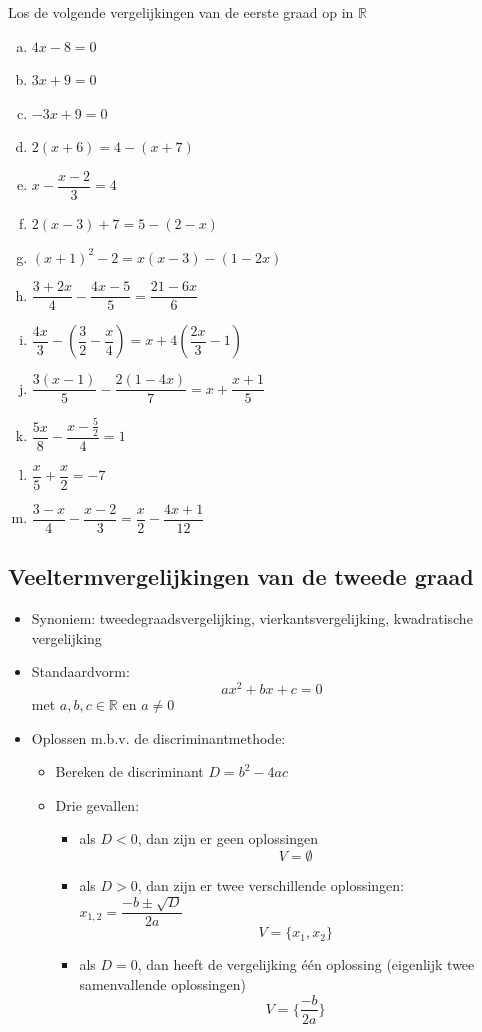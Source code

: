 \documentclass[12pt]{article}
\begin{document}
\begin{oefening}
Los de volgende vergelijkingen van de eerste graad op in $\mathbb{R}$
\begin{multicols}{2}
\begin{enumerate}[(a)]
  \itemsep0.7em
  \item $4x-8=0$
  \item $3x+9=0$
  \item $-3x+9=0$
  \item $2(x+6)=4-(x+7)$
  \item $x - \dfrac{x-2}{3} = 4$
  \item $2(x-3)+7=5-(2-x)$
  \item $(x+1)^2-2=x(x-3)-(1-2x)$
  \item $\dfrac{3+2x}{4}-\dfrac{4x-5}{5}=\dfrac{21-6x}{6}$
  \item $\dfrac{4x}{3}-\left(\dfrac{3}{2}-\dfrac{x}{4}\right)=x+4\left(\dfrac{2x}{3}-1\right)$
  \item $\dfrac{3(x-1)}{5}-\dfrac{2(1-4x)}{7}=x+\dfrac{x+1}{5}$
  \item $\dfrac{5x}{8}-\dfrac{x-\frac{5}{2}}{4}=1$
  \item $\dfrac{x}{5}+\dfrac{x}{2}=-7$
  \item $\dfrac{3-x}{4}-\dfrac{x-2}{3}=\dfrac{x}{2}-\dfrac{4x+1}{12}$
\end{enumerate}
\end{multicols}
\end{oefening}

\pagebreak
\subsection{Veeltermvergelijkingen van de tweede graad}

\begin{itemize}
  \item Synoniem: tweedegraadsvergelijking, vierkantsvergelijking, kwadratische vergelijking
  \item Standaardvorm:
  $$ax^2 + bx + c = 0$$
  met $a, b, c \in \mathbb{R}$ en $a\neq 0$
  \item Oplossen m.b.v. de discriminantmethode:
  \begin{itemize}
    \item Bereken de discriminant $D=b^2-4ac$
    \item Drie gevallen:
    \begin{itemize}
      \item als $D<0$, dan zijn er geen oplossingen
      $$V=\emptyset$$
      \item als $D>0$, dan zijn er twee verschillende oplossingen: $x_{1,2}=\dfrac{-b\pm\sqrt{D}}{2a}$
      $$V=\{x_1, x_2\}$$
      \item als $D=0$, dan heeft de vergelijking één oplossing (eigenlijk twee samenvallende oplossingen)
      $$V=\{\dfrac{-b}{2a}\}$$
    \end{itemize}
  \end{itemize}
\end{itemize}
\end{document}
